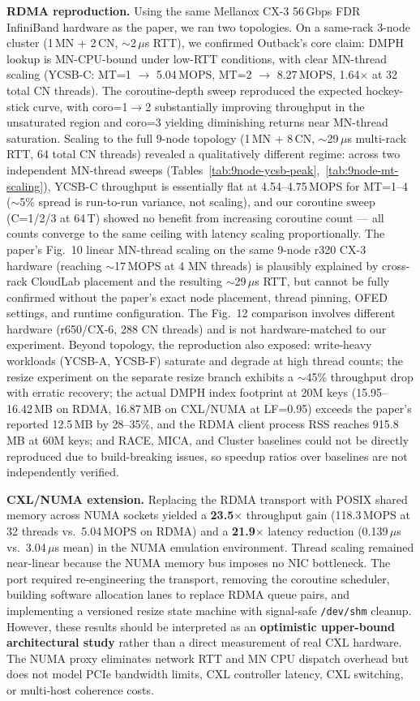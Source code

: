 \documentclass[conference]{IEEEtran}
\begin{document}
\textbf{RDMA reproduction.} Using the same Mellanox CX-3 56\,Gbps FDR InfiniBand hardware as the paper, we ran two topologies. On a same-rack 3-node cluster (1\,MN + 2\,CN, $\sim$2\,$\mu$s RTT), we confirmed Outback's core claim: DMPH lookup is MN-CPU-bound under low-RTT conditions, with clear MN-thread scaling (YCSB-C: MT=1 $\to$ 5.04\,MOPS, MT=2 $\to$ 8.27\,MOPS, 1.64$\times$ at 32 total CN threads). The coroutine-depth sweep reproduced the expected hockey-stick curve, with coro=1$\to$2 substantially improving throughput in the unsaturated region and coro=3 yielding diminishing returns near MN-thread saturation. Scaling to the full 9-node topology (1\,MN + 8\,CN, $\sim$29\,$\mu$s multi-rack RTT, 64 total CN threads) revealed a qualitatively different regime: across two independent MN-thread sweeps (Tables~\ref{tab:9node-ycsb-peak},~\ref{tab:9node-mt-scaling}), YCSB-C throughput is essentially flat at 4.54--4.75\,MOPS for MT=1--4 ($\sim$5\% spread is run-to-run variance, not scaling), and our coroutine sweep (C=1/2/3 at 64\,T) showed no benefit from increasing coroutine count --- all counts converge to the same ceiling with latency scaling proportionally. The paper's Fig.~10 linear MN-thread scaling on the same 9-node r320 CX-3 hardware (reaching $\sim$17\,MOPS at 4 MN threads) is plausibly explained by cross-rack CloudLab placement and the resulting $\sim$29\,$\mu$s RTT, but cannot be fully confirmed without the paper's exact node placement, thread pinning, OFED settings, and runtime configuration. The Fig.~12 comparison involves different hardware (r650/CX-6, 288 CN threads) and is not hardware-matched to our experiment. Beyond topology, the reproduction also exposed: write-heavy workloads (YCSB-A, YCSB-F) saturate and degrade at high thread counts; the resize experiment on the separate resize branch exhibits a $\sim$45\% throughput drop with erratic recovery; the actual DMPH index footprint at 20M keys (15.95--16.42\,MB on RDMA, 16.87\,MB on CXL/NUMA at LF=0.95) exceeds the paper's reported 12.5\,MB by 28--35\%, and the RDMA client process RSS reaches 915.8\,MB at 60M keys; and RACE, MICA, and Cluster baselines could not be directly reproduced due to build-breaking issues, so speedup ratios over baselines are not independently verified.

\textbf{CXL/NUMA extension.} Replacing the RDMA transport with POSIX shared memory across NUMA sockets yielded a \textbf{23.5$\times$} throughput gain (118.3\,MOPS at 32 threads vs.\ 5.04\,MOPS on RDMA) and a \textbf{21.9$\times$} latency reduction (0.139\,$\mu$s vs.\ 3.04\,$\mu$s mean) in the NUMA emulation environment. Thread scaling remained near-linear because the NUMA memory bus imposes no NIC bottleneck. The port required re-engineering the transport, removing the coroutine scheduler, building software allocation lanes to replace RDMA queue pairs, and implementing a versioned resize state machine with signal-safe \texttt{/dev/shm} cleanup. However, these results should be interpreted as an \textbf{optimistic upper-bound architectural study} rather than a direct measurement of real CXL hardware. The NUMA proxy eliminates network RTT and MN CPU dispatch overhead but does not model PCIe bandwidth limits, CXL controller latency, CXL switching, or multi-host coherence costs.
\end{document}
